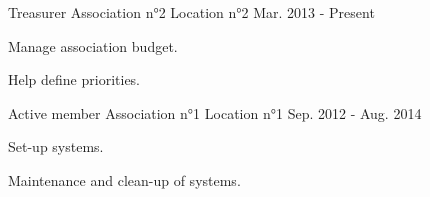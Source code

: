 


\begin{cventries}


\cventry
{Treasurer} %
{Association n°2} %
{Location n°2} %
{Mar. 2013 - Present} %
{ %
\begin{cvitems}
\item {Manage association budget.}
\item {Help define priorities.}
\end{cvitems}
}


\cventry
{Active member} %
{Association n°1} %
{Location n°1} %
{Sep. 2012 - Aug. 2014} %
{ %
\begin{cvitems}
\item {Set-up systems.}
\item {Maintenance and clean-up of systems.}
\end{cvitems}
}


\end{cventries}